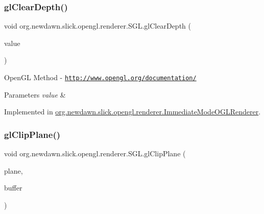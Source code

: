 \mbox{\label{interfaceorg_1_1newdawn_1_1slick_1_1opengl_1_1renderer_1_1_s_g_l_ab485cf2f4c743772ed5d24a66d7c1af3}} 
\subsubsection{\texorpdfstring{gl\+Clear\+Depth()}{glClearDepth()}}
{\footnotesize\ttfamily void org.\+newdawn.\+slick.\+opengl.\+renderer.\+S\+G\+L.\+gl\+Clear\+Depth (\begin{DoxyParamCaption}\item[{float}]{value }\end{DoxyParamCaption})}

Open\+GL Method -\/  \href{http://www.opengl.org/documentation/}{\tt http\+://www.\+opengl.\+org/documentation/}


\begin{DoxyParams}{Parameters}
{\em value} & \\
\hline
\end{DoxyParams}


Implemented in \mbox{\hyperlink{classorg_1_1newdawn_1_1slick_1_1opengl_1_1renderer_1_1_immediate_mode_o_g_l_renderer_a00cacf4aac9d008657c1be3c9df5da90}{org.\+newdawn.\+slick.\+opengl.\+renderer.\+Immediate\+Mode\+O\+G\+L\+Renderer}}.

\mbox{\label{interfaceorg_1_1newdawn_1_1slick_1_1opengl_1_1renderer_1_1_s_g_l_aa0ecf8896be6f072c3d38372179071f8}} 
\subsubsection{\texorpdfstring{gl\+Clip\+Plane()}{glClipPlane()}}
{\footnotesize\ttfamily void org.\+newdawn.\+slick.\+opengl.\+renderer.\+S\+G\+L.\+gl\+Clip\+Plane (\begin{DoxyParamCaption}\item[{int}]{plane,  }\item[{Double\+Buffer}]{buffer }\end{DoxyParamCaption})}

